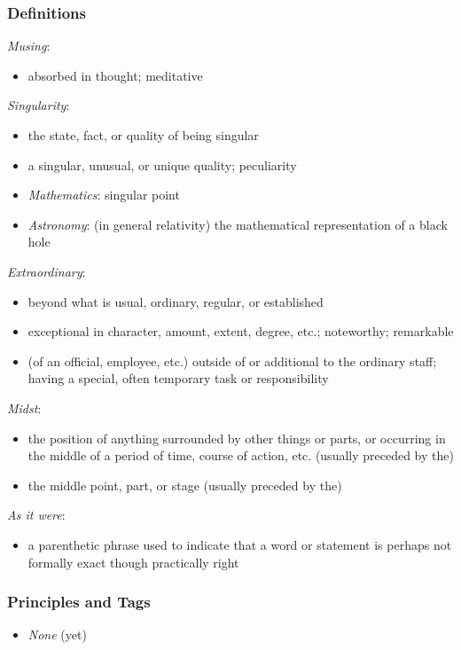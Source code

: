 \documentclass[12pt]{report}
\begin{document}
\subsubsection{Definitions\label{js:DFN11}}
\emph{Musing}: \begin{itemize}
\item absorbed in thought; meditative
\end{itemize}
\emph{Singularity}: \begin{itemize}
\item the state, fact, or quality of being singular
\item a singular, unusual, or unique quality; peculiarity
\item \emph{Mathematics}: singular point
\item \emph{Astronomy}: (in general relativity) the mathematical representation of a black hole
\end{itemize}
\emph{Extraordinary}: \begin{itemize}
\item beyond what is usual, ordinary, regular, or established
\item exceptional in character, amount, extent, degree, etc.; noteworthy; remarkable
\item (of an official, employee, etc.) outside of or additional to the ordinary staff; having a special, often temporary task or responsibility
\end{itemize}
\emph{Midst}: \begin{itemize}
\item the position of anything surrounded by other things or parts, or occurring in the middle of a period of time, course of action, etc. (usually preceded by the)
\item the middle point, part, or stage (usually preceded by the)
\end{itemize}
\emph{As it were}: \begin{itemize}
\item a parenthetic phrase used to indicate that a word or statement is perhaps not formally exact though practically right
\end{itemize}

\subsubsection{Principles and Tags\label{js:principles11}}
\begin{itemize}
\item \index{}\emph{None} (yet)
\end{itemize}
\end{document}
